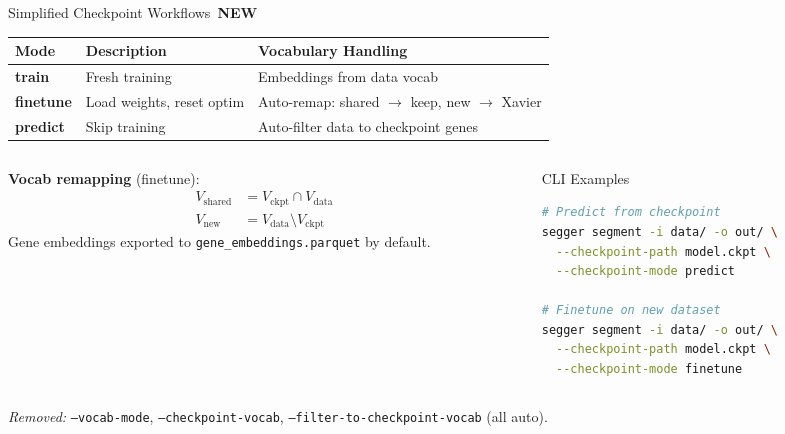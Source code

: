 \documentclass[aspectratio=169,10pt]{beamer}
\newcommand{\NEW}{\,{\scriptsize\colorbox{newgreen}{\color{white}\textbf{NEW}}}\,}
\begin{document}
\begin{frame}[fragile]{Simplified Checkpoint Workflows \NEW}

\begin{center}
{\small
\renewcommand{\arraystretch}{1.2}
\begin{tabular}{@{}>{\bfseries\ttfamily}l p{3.5cm} p{5cm}@{}}
\toprule
\textrm{\textbf{Mode}} & \textbf{Description} & \textbf{Vocabulary Handling} \\
\midrule
train & Fresh training & Embeddings from data vocab \\
finetune & Load weights, reset optim & Auto-remap: shared $\to$ keep, new $\to$ Xavier \\
predict & Skip training & Auto-filter data to checkpoint genes \\
\bottomrule
\end{tabular}
}
\end{center}

\vspace{0.15cm}

\begin{columns}[T]
\begin{column}{0.48\textwidth}
{\small
\textbf{Vocab remapping} (finetune):
\vspace{-0.15cm}
\begin{align*}
  V_{\text{shared}} &= V_{\text{ckpt}} \cap V_{\text{data}} \\
  V_{\text{new}} &= V_{\text{data}} \setminus V_{\text{ckpt}}
\end{align*}
Gene embeddings exported to \texttt{gene\_embeddings.parquet} by default.
}
\end{column}
\begin{column}{0.48\textwidth}
\begin{exampleblock}{CLI Examples}
\begin{lstlisting}[language=bash]
# Predict from checkpoint
segger segment -i data/ -o out/ \
  --checkpoint-path model.ckpt \
  --checkpoint-mode predict

# Finetune on new dataset
segger segment -i data/ -o out/ \
  --checkpoint-path model.ckpt \
  --checkpoint-mode finetune
\end{lstlisting}
\end{exampleblock}
\end{column}
\end{columns}

\vspace{0.05cm}
{\footnotesize\textit{Removed:} \texttt{--vocab-mode}, \texttt{--checkpoint-vocab}, \texttt{--filter-to-checkpoint-vocab} (all auto).}
\end{frame}
\end{document}
